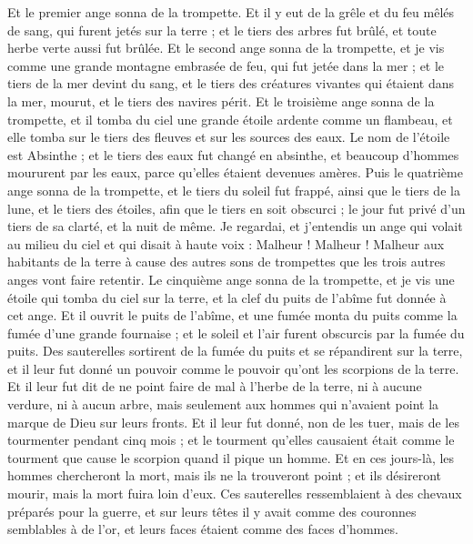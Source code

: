 \begin{multicols}{2}
Et le premier ange sonna de la trompette. Et il y eut de la grêle et du feu mêlés de sang, qui furent jetés sur la terre ; et le tiers des arbres fut brûlé, et toute herbe verte aussi fut brûlée.
Et le second ange sonna de la trompette, et je vis comme une grande montagne embrasée de feu, qui fut jetée dans la mer ; et le tiers de la mer devint du sang,
et le tiers des créatures vivantes qui étaient dans la mer, mourut, et le tiers des navires périt.
Et le troisième ange sonna de la trompette, et il tomba du ciel une grande étoile ardente comme un flambeau, et elle tomba sur le tiers des fleuves et sur les sources des eaux.
Le nom de l'étoile est Absinthe ; et le tiers des eaux fut changé en absinthe, et beaucoup d'hommes moururent par les eaux, parce qu'elles étaient devenues amères.
Puis le quatrième ange sonna de la trompette, et le tiers du soleil fut frappé, ainsi que le tiers de la lune, et le tiers des étoiles, afin que le tiers en soit obscurci ; le jour fut privé d'un tiers de sa clarté, et la nuit de même.
Je regardai, et j'entendis un ange qui volait au milieu du ciel et qui disait à haute voix : Malheur ! Malheur ! Malheur aux habitants de la terre à cause des autres sons de trompettes que les trois autres anges vont faire retentir.
\VerseOne{}Le cinquième ange sonna de la trompette, et je vis une étoile qui tomba du ciel sur la terre, et la clef du puits de l'abîme fut donnée à cet ange.
Et il ouvrit le puits de l'abîme, et une fumée monta du puits comme la fumée d'une grande fournaise ; et le soleil et l'air furent obscurcis par la fumée du puits.
Des sauterelles sortirent de la fumée du puits et se répandirent sur la terre, et il leur fut donné un pouvoir comme le pouvoir qu'ont les scorpions de la terre.
Et il leur fut dit de ne point faire de mal à l'herbe de la terre, ni à aucune verdure, ni à aucun arbre, mais seulement aux hommes qui n'avaient point la marque de Dieu sur leurs fronts.
Et il leur fut donné, non de les tuer, mais de les tourmenter pendant cinq mois ; et le tourment qu'elles causaient était comme le tourment que cause le scorpion quand il pique un homme.
Et en ces jours-là, les hommes chercheront la mort, mais ils ne la trouveront point ; et ils désireront mourir, mais la mort fuira loin d'eux.
Ces sauterelles ressemblaient à des chevaux préparés pour la guerre, et sur leurs têtes il y avait comme des couronnes semblables à de l'or, et leurs faces étaient comme des faces d'hommes.

\end{multicols}
